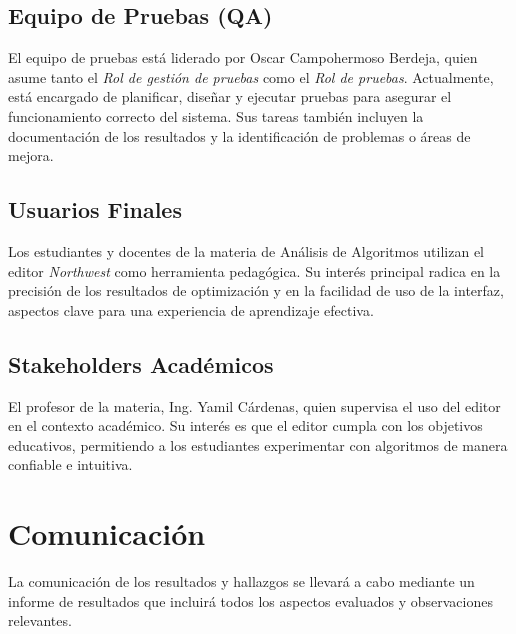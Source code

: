 \documentclass[stu, 12pt, letterpaper, donotrepeattitle, floatsintext, natbib]{apa7}
\begin{document}
\subsection{Equipo de Pruebas (QA)} 
El equipo de pruebas está liderado por Oscar Campohermoso Berdeja, quien asume tanto el \textit{Rol de gestión de pruebas} como el \textit{Rol de pruebas}. Actualmente, está encargado de planificar, diseñar y ejecutar pruebas para asegurar el funcionamiento correcto del sistema. Sus tareas también incluyen la documentación de los resultados y la identificación de problemas o áreas de mejora.

\subsection{Usuarios Finales} 
Los estudiantes y docentes de la materia de Análisis de Algoritmos utilizan el editor \textit{Northwest} como herramienta pedagógica. Su interés principal radica en la precisión de los resultados de optimización y en la facilidad de uso de la interfaz, aspectos clave para una experiencia de aprendizaje efectiva.

\subsection{Stakeholders Académicos} 
El profesor de la materia, Ing. Yamil Cárdenas, quien supervisa el uso del editor en el contexto académico. Su interés es que el editor cumpla con los objetivos educativos, permitiendo a los estudiantes experimentar con algoritmos de manera confiable e intuitiva.

\section{\large Comunicación}

\noindent La comunicación de los resultados y hallazgos se llevará a cabo mediante un informe de resultados que incluirá todos los aspectos evaluados y observaciones relevantes.
\end{document}
